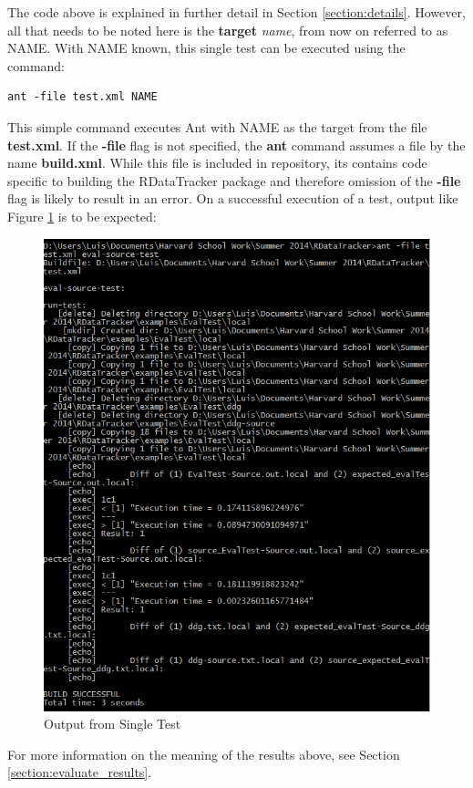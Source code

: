\documentclass[12pt]{article}
\begin{document}
The code above is explained in further detail in Section \ref{section:details}. However, all that needs to be noted here is the \textbf{target} \textit{name}, from now on referred to as NAME. With NAME known, this single test can be executed using the command:

\begin{lstlisting}
ant -file test.xml NAME
\end{lstlisting}
This simple command executes Ant with NAME as the target from the file \textbf{test.xml}. If the \textbf{-file} flag is not specified, the \textbf{ant} command assumes a file by the name \textbf{build.xml}. While this file is included in repository, its contains code specific to building the RDataTracker package and therefore omission of the \textbf{-file} flag is likely to result in an error. On a successful execution of a test, output like Figure \ref{fig:single_test_out} is to be expected:

\begin{figure}[!ht]
\caption{Output from Single Test}
\label{fig:single_test_out}
\begin{center}
\includegraphics[scale=0.4]{UsingRDataTrackerTests-img/single-test-out.PNG}
\end{center}
\end{figure}
For more information on the meaning of the results above, see Section \ref{section:evaluate_results}.
\end{document}

